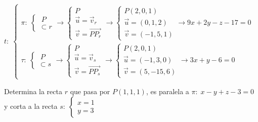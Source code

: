 \begin{proofw}\renewcommand{\qedsymbol}{$\diamond$}
	\small{$t:\; \begin{cases}
 	\pi :\;  \begin{cases} \;P \\ \subset r \end{cases} \to \begin{cases} P \\ \vec u= \vec v_r \\  \vec v=\overrightarrow{PP_r} \end{cases} 
 	\to \begin{cases} P(2,0,1) \\ \vec u=(0,1,2 ) \\ \vec v= (-1,5,1) \end{cases} \to 9x+2y-z-17=0
 	\\
 	\tau:\;  \begin{cases} \;P \\ \subset s \end{cases}  \to \begin{cases} P \\ \vec u= \vec v_s \\  \vec v=\overrightarrow{PP_s} \end{cases} 
 	\to \begin{cases} P(2,0,1) \\ \vec u=(-1,3,0 ) \\ \vec v= (5,-15,6) \end{cases} \to 3x+y-6=0
 \end{cases}$}

\end{proofw}



\begin{ejre}
	\normalsize{Determina} la recta $r$ que pasa por $P(1,1,1)$, es paralela a $\pi:\; x-y+z-3=0$ y corta a la recta $s:\; \begin{cases} x=1\\y=3 \end{cases}$
\end{ejre}

